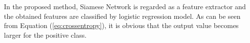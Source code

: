 \documentclass[a4paper,12pt]{article}
\begin{document}
In the proposed method, Siamese Network is regarded as a feature extractor and the obtained features are classified by logistic regression model.
As can be seen from Equation (\ref{eq:crossentropy}), it is obvious that the output value becomes larger for the positive class.

\end{document}

